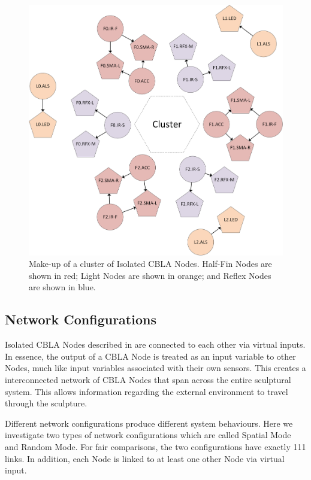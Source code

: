 \begin{figure} [!htbp]
	\centering
	\includegraphics[width=1.0\textwidth]{"fig/validations/Isolated CBLA Nodes"}
	\caption[Make-up of a cluster of Isolated CBLA Nodes]{Make-up of a cluster of Isolated CBLA Nodes. Half-Fin Nodes are shown in red; Light Nodes are shown in orange; and Reflex Nodes are shown in blue.}
	\label{fig:Isolated CBLA Nodes}
\end{figure}


\subsection{Network Configurations}

Isolated CBLA Nodes described in  are connected to each other via virtual inputs. In essence, the output of a CBLA Node is treated as an input variable to other Nodes, much like input variables associated with their own sensors. This creates a interconnected network of CBLA Nodes that span across the entire sculptural system. This allows information regarding the external environment to travel through the sculpture. 

Different network configurations produce different system behaviours. Here we investigate two types of network configurations which are called Spatial Mode and Random Mode. For fair comparisons, the two configurations have exactly 111 links. In addition, each Node is linked to at least one other Node via virtual input. 

